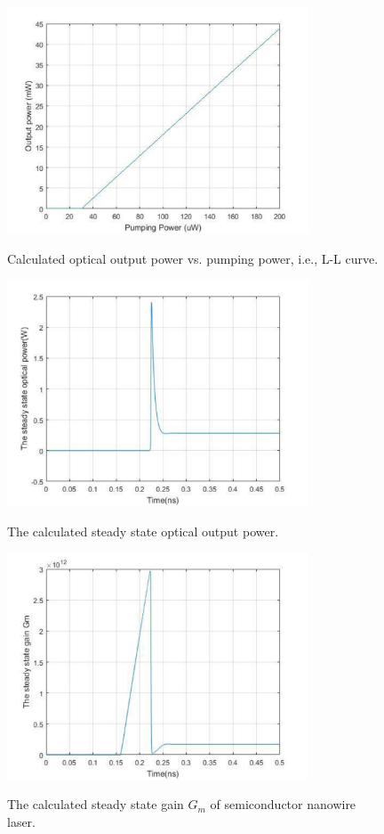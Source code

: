 \begin{figure}
  \caption{Calculated optical output power vs. pumping power, i.e., L-L curve.}
  \centering
  \includegraphics[width=0.8\textwidth]{pictures/LT/L-L}
  \label{L-L}
\end{figure}

\begin{figure}
  \caption{The calculated steady state optical output power.}
  \centering
  \includegraphics[width=0.8\textwidth]{pictures/LT/SteadyPower}
  \label{SteadyPower}
\end{figure}

\begin{figure}
  \caption{The calculated steady state gain $G_m$ of semiconductor nanowire laser.}
  \centering
  \includegraphics[width=0.8\textwidth]{pictures/LT/SteadyGain}
  \label{SteadyGain}
\end{figure}

